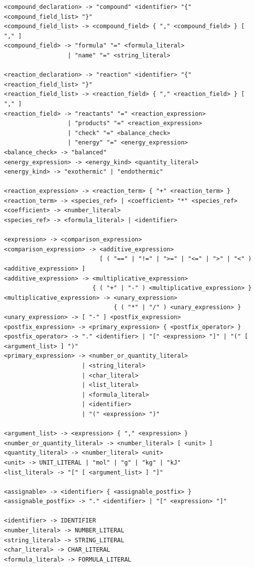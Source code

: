\documentclass[11pt,a4paper]{article}
\begin{document}
\begin{lstlisting}[style=ebnf]
<compound_declaration> -> "compound" <identifier> "{" <compound_field_list> "}"
<compound_field_list> -> <compound_field> { "," <compound_field> } [ "," ]
<compound_field> -> "formula" "=" <formula_literal>
                  | "name" "=" <string_literal>

<reaction_declaration> -> "reaction" <identifier> "{" <reaction_field_list> "}"
<reaction_field_list> -> <reaction_field> { "," <reaction_field> } [ "," ]
<reaction_field> -> "reactants" "=" <reaction_expression>
                  | "products" "=" <reaction_expression>
                  | "check" "=" <balance_check>
                  | "energy" "=" <energy_expression>
<balance_check> -> "balanced"
<energy_expression> -> <energy_kind> <quantity_literal>
<energy_kind> -> "exothermic" | "endothermic"

<reaction_expression> -> <reaction_term> { "+" <reaction_term> }
<reaction_term> -> <species_ref> | <coefficient> "*" <species_ref>
<coefficient> -> <number_literal>
<species_ref> -> <formula_literal> | <identifier>

<expression> -> <comparison_expression>
<comparison_expression> -> <additive_expression>
                           [ ( "==" | "!=" | ">=" | "<=" | ">" | "<" ) <additive_expression> ]
<additive_expression> -> <multiplicative_expression>
                         { ( "+" | "-" ) <multiplicative_expression> }
<multiplicative_expression> -> <unary_expression>
                               { ( "*" | "/" ) <unary_expression> }
<unary_expression> -> [ "-" ] <postfix_expression>
<postfix_expression> -> <primary_expression> { <postfix_operator> }
<postfix_operator> -> "." <identifier> | "[" <expression> "]" | "(" [ <argument_list> ] ")"
<primary_expression> -> <number_or_quantity_literal>
                      | <string_literal>
                      | <char_literal>
                      | <list_literal>
                      | <formula_literal>
                      | <identifier>
                      | "(" <expression> ")"

<argument_list> -> <expression> { "," <expression> }
<number_or_quantity_literal> -> <number_literal> [ <unit> ]
<quantity_literal> -> <number_literal> <unit>
<unit> -> UNIT_LITERAL | "mol" | "g" | "kg" | "kJ"
<list_literal> -> "[" [ <argument_list> ] "]"

<assignable> -> <identifier> { <assignable_postfix> }
<assignable_postfix> -> "." <identifier> | "[" <expression> "]"

<identifier> -> IDENTIFIER
<number_literal> -> NUMBER_LITERAL
<string_literal> -> STRING_LITERAL
<char_literal> -> CHAR_LITERAL
<formula_literal> -> FORMULA_LITERAL
\end{lstlisting}
\end{document}
